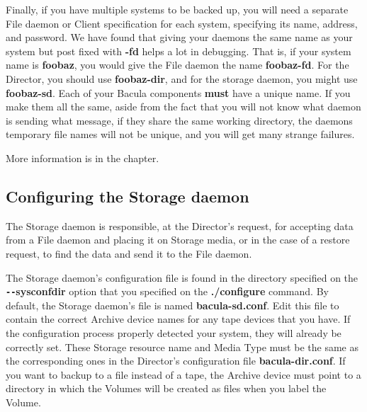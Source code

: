 Finally, if you have multiple systems to be backed up, you will need a
separate File daemon or Client specification for each system, specifying its
name, address, and password. We have found that giving your daemons the same
name as your system but post fixed with {\bf -fd} helps a lot in debugging.
That is, if your system name is {\bf foobaz}, you would give the File daemon
the name {\bf foobaz-fd}. For the Director, you should use {\bf foobaz-dir},
and for the storage daemon, you might use {\bf foobaz-sd}. 
Each of your Bacula components {\bf must} have a unique name.  If you
make them all the same, aside from the fact that you will not
know what daemon is sending what message, if they share the same
working directory, the daemons temporary file names will not
be unique, and you will get many strange failures.

More information is in the
 chapter.

\subsection{Configuring the Storage daemon}

The Storage daemon is responsible, at the Director's request, for accepting
data from a File daemon and placing it on Storage media, or in the case of a
restore request, to find the data and send it to the File daemon. 

The Storage daemon's configuration file is found in the directory specified on
the {\bf \verb:--:sysconfdir} option that you specified on the {\bf ./configure}
command. By default, the Storage daemon's file is named {\bf bacula-sd.conf}.
Edit this file to contain the correct Archive device names for any tape
devices that you have. If the configuration process properly detected your
system, they will already be correctly set. These Storage resource name and
Media Type must be the same as the corresponding ones in the Director's
configuration file {\bf bacula-dir.conf}. If you want to backup to a file
instead of a tape, the Archive device must point to a directory in which the
Volumes will be created as files when you label the Volume. 
\label{ConfigTesting}

